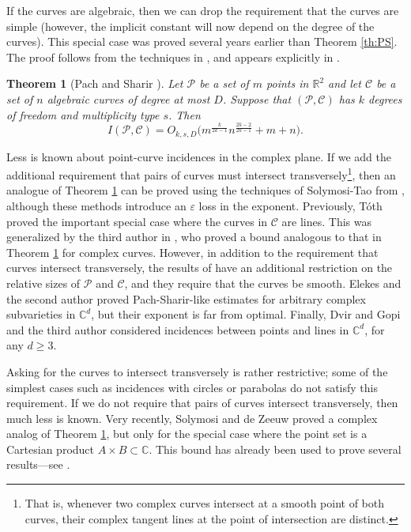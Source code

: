 \documentclass[letterpaper, reqno,11pt]{article}
\newtheorem{theorem}{Theorem}[section]
\theoremstyle{remark}
\newcommand{\RR}{\mathbb{R}}
\newcommand{\CC}{\mathbb{C}}
\newcommand{\pts}{\mathcal P}
\newcommand{\curves}{\mathcal C}
\newcommand{\eps}{\varepsilon}
\begin{document}
If the curves are algebraic, then we can drop the requirement that the curves are simple (however, the implicit constant will now depend on the degree of the curves). This special case was proved several years earlier than Theorem \ref{th:PS}. The proof follows from the techniques in \cite{Clarkson}, and appears explicitly in \cite{PS92}.
\begin{theorem}[Pach and Sharir \cite{PS92,PS}] \label{th:PSAlg}
Let $\pts$ be a set of $m$ points in $\RR^2$ and let $\curves$ be a set of $n$ algebraic curves of degree at most $D$.  Suppose that $(\pts,\curves)$ has $k$ degrees of freedom and multiplicity type $s$. Then
\begin{equation} \label{PSCTheoremEqn}
I(\pts,\curves) = O_{k,s,D}\big(m^{\frac{k}{2k-1}}n^{\frac{2k-2}{2k-1}}+m+n\big).
\end{equation}

\end{theorem}

Less is known about point-curve incidences in the complex plane. If we
add the additional requirement that pairs of curves must intersect
transversely\footnote{That is, whenever two complex curves intersect
  at a smooth point of both curves, their complex tangent lines at the
  point of intersection are distinct.}, then an analogue of Theorem
\ref{th:PSAlg} can be proved using the techniques of Solymosi-Tao from
\cite{ST}, although these methods introduce an $\eps$ loss in the
exponent. Previously, T\'oth \cite{Toth14} proved the important
special case where the curves in $\curves$ are lines. This was
generalized by the third author in \cite{zahl}, who proved a bound
analogous to that in Theorem \ref{th:PSAlg} for complex
curves. However, in addition to the requirement that curves intersect
transversely, the results of \cite{zahl} have an additional
restriction on the relative sizes of $\pts$ and $\curves$, and they
require that the curves be smooth.
  Elekes and the second author \cite[Theorem 9]{elekes2012find}
  proved Pach-Sharir-like estimates for arbitrary complex subvarieties in $\CC^d$,
  but their exponent is far from optimal.
Finally, Dvir and Gopi \cite{DG15}
and the third
author \cite{zahl2} considered incidences between points
and lines in $\CC^d$, for any $d\ge 3$.

Asking for the curves to intersect transversely is rather restrictive; some of the simplest cases such as incidences with circles or parabolas do not satisfy this requirement. If we do not require that pairs of curves intersect transversely, then much less is known. Very recently, Solymosi and de Zeeuw \cite{SdZ14} proved a complex analog of Theorem \ref{th:PSAlg}, but only for the special case where the point set is a Cartesian product $A\times B \subset \CC$. This bound has already been used to prove several results---see \cite{RSZ14,VdZ14}.
\end{document}
